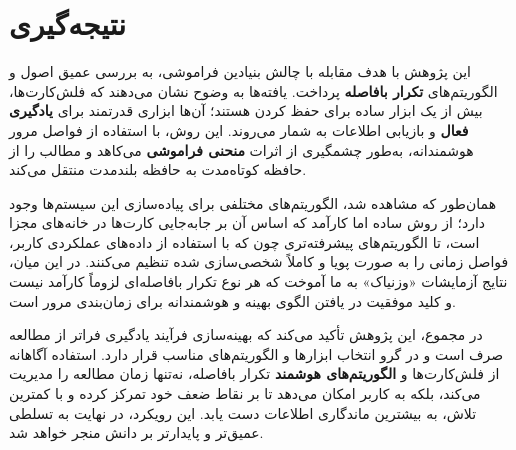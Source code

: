 \documentclass[12pt]{report}
\begin{document}
\chapter*{نتیجه‌گیری}

این پژوهش با هدف مقابله با چالش بنیادین فراموشی، به بررسی عمیق اصول و الگوریتم‌های \textbf{تکرار بافاصله} پرداخت. یافته‌ها به وضوح نشان می‌دهند که فلش‌کارت‌ها، بیش از یک ابزار ساده برای حفظ کردن هستند؛ آن‌ها ابزاری قدرتمند برای \textbf{یادگیری فعال} و بازیابی اطلاعات به شمار می‌روند. این روش، با استفاده از فواصل مرور هوشمندانه، به‌طور چشمگیری از اثرات \textbf{منحنی فراموشی} می‌کاهد و مطالب را از حافظه کوتاه‌مدت به حافظه بلندمدت منتقل می‌کند.

همان‌طور که مشاهده شد، الگوریتم‌های مختلفی برای پیاده‌سازی این سیستم‌ها وجود دارد؛ از روش ساده اما کارآمد  که اساس آن بر جابه‌جایی کارت‌ها در خانه‌های مجزا است، تا الگوریتم‌های پیشرفته‌تری چون  که با استفاده از داده‌های عملکردی کاربر، فواصل زمانی را به صورت پویا و کاملاً شخصی‌سازی شده تنظیم می‌کنند. در این میان، نتایج آزمایشات «وزنیاک» به ما آموخت که هر نوع تکرار بافاصله‌ای لزوماً کارآمد نیست و کلید موفقیت در یافتن الگوی بهینه و هوشمندانه برای زمان‌بندی مرور است.

در مجموع، این پژوهش تأکید می‌کند که بهینه‌سازی فرآیند یادگیری فراتر از مطالعه صرف است و در گرو انتخاب ابزارها و الگوریتم‌های مناسب قرار دارد. استفاده آگاهانه از فلش‌کارت‌ها و \textbf{الگوریتم‌های هوشمند} تکرار بافاصله، نه‌تنها زمان مطالعه را مدیریت می‌کند، بلکه به کاربر امکان می‌دهد تا بر نقاط ضعف خود تمرکز کرده و با کمترین تلاش، به بیشترین ماندگاری اطلاعات دست یابد. این رویکرد، در نهایت به تسلطی عمیق‌تر و پایدارتر بر دانش منجر خواهد شد.


\end{document}
